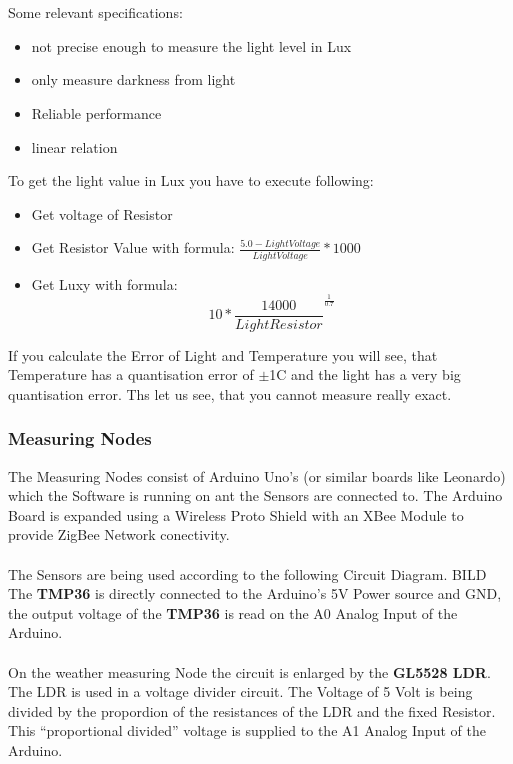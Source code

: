 \documentclass[
	11pt,
	a4paper
]{article}%
\begin{document}
\\\\
Some relevant specifications:
\begin{itemize}
\item not precise enough to measure the light level in Lux
\item only measure darkness from light
\item Reliable performance
\item linear relation
\end{itemize}
To get the light value in Lux you have to execute following:
\begin{itemize}
\item Get voltage of Resistor
\item Get Resistor Value with formula: $\frac{5.0-LightVoltage}{LightVoltage}*1000$
\item Get Luxy with formula: 
	\begin{equation*}
		10*\frac{14000}{Light Resistor}^\frac{1}{0.7}
	\end{equation*}
\end{itemize}
If you calculate the Error of Light and Temperature you will see, that Temperature has a quantisation error of $\pm$1\degree C and the light has a very big quantisation error. Ths let us see, that you cannot measure really exact.

\subsubsection{Measuring Nodes}
The Measuring Nodes consist of Arduino Uno's (or similar boards like Leonardo) which the Software is running on ant the Sensors are connected to. The Arduino Board is expanded using a Wireless Proto Shield with an XBee Module to provide ZigBee Network conectivity.
\\\\
The Sensors are being used according to the following Circuit Diagram.
BILD
The \textbf{TMP36} is directly connected to the Arduino's 5V Power source and GND, the output voltage of the \textbf{TMP36} is read on the A0 Analog Input of the Arduino.
\\\\
On the weather measuring Node the circuit is enlarged by the \textbf{GL5528 LDR}. The LDR is used in a voltage divider circuit. The Voltage of 5 Volt is being divided by the propordion of the resistances of the LDR and the fixed Resistor. This “proportional divided” voltage is supplied to the A1 Analog Input of the Arduino.
\end{document}
